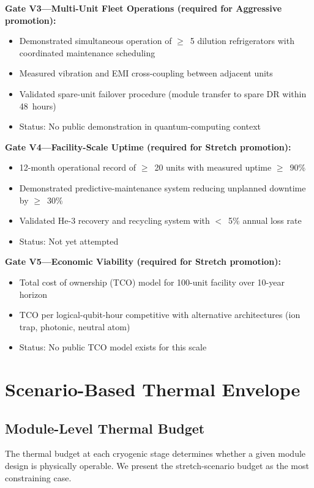 \documentclass[conference]{IEEEtran}
\begin{document}
\textbf{Gate V3---Multi-Unit Fleet Operations (required for Aggressive promotion):}
\begin{itemize}
\item Demonstrated simultaneous operation of $\geq$~5 dilution refrigerators with coordinated maintenance scheduling
\item Measured vibration and EMI cross-coupling between adjacent units
\item Validated spare-unit failover procedure (module transfer to spare DR within 48~hours)
\item Status: No public demonstration in quantum-computing context
\end{itemize}

\textbf{Gate V4---Facility-Scale Uptime (required for Stretch promotion):}
\begin{itemize}
\item 12-month operational record of $\geq$~20 units with measured uptime $\geq$~90\%
\item Demonstrated predictive-maintenance system reducing unplanned downtime by $\geq$~30\%
\item Validated He-3 recovery and recycling system with $<$~5\% annual loss rate
\item Status: Not yet attempted
\end{itemize}

\textbf{Gate V5---Economic Viability (required for Stretch promotion):}
\begin{itemize}
\item Total cost of ownership (TCO) model for 100-unit facility over 10-year horizon
\item TCO per logical-qubit-hour competitive with alternative architectures (ion trap, photonic, neutral atom)
\item Status: No public TCO model exists for this scale
\end{itemize}

\section{Scenario-Based Thermal Envelope}

\subsection{Module-Level Thermal Budget}

The thermal budget at each cryogenic stage determines whether a given module design is physically operable. We present the stretch-scenario budget as the most constraining case.
\end{document}
